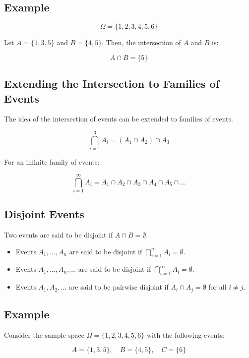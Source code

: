 \documentclass{article}
\begin{document}
\subsection*{Example}

\[
\Omega = \{1, 2, 3, 4, 5, 6\}
\]

Let \(A = \{1, 3, 5\}\) and \(B = \{4, 5\}\). Then, the intersection of \(A\) and \(B\) is:

\[
A \cap B = \{5\}
\]

\subsection*{Extending the Intersection to Families of Events}

The idea of the intersection of events can be extended to families of events.

\[
\bigcap_{i=1}^{3} A_i = (A_1 \cap A_2) \cap A_3
\]

For an infinite family of events:

\[
\bigcap_{i=1}^{\infty} A_i = A_1 \cap A_2 \cap A_3 \cap A_4 \cap A_5 \cap \ldots
\]


\subsection*{Disjoint Events}

Two events are said to be disjoint if \(A \cap B = \emptyset\).

\begin{itemize}
    \item Events \(A_1, \ldots, A_n\) are said to be disjoint if \(\textstyle \bigcap_{i=1}^{n} A_i = \emptyset \).

    \item Events \(A_1, \ldots, A_n, \ldots\) are said to be disjoint if \(\textstyle \bigcap_{i=1}^{\infty} A_i = \emptyset \).
 
    \item Events \(A_1, A_2, \ldots\) are said to be pairwise disjoint if \(A_i \cap A_j = \emptyset\) for all \(i \neq j\).
\end{itemize}

\subsection*{Example}

Consider the sample space \(\Omega = \{1, 2, 3, 4, 5, 6\}\) with the following events:

\[
A = \{1, 3, 5\}, \quad B = \{4, 5\}, \quad C = \{6\}
\]
\end{document}
